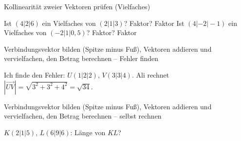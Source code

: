 \begin{aufgabe}{Kollinearität zweier Vektoren prüfen (Vielfaches)}
\begin{teile}
\teil Ist $(4 | 2 | 6)$ ein Vielfaches von $(2 | 1 | 3)$? Faktor? Faktor \leerfeld
\teil Ist $(4 | -2 | -1)$ ein Vielfaches von $(-2 | 1 | 0{,}5)$? Faktor? Faktor \leerfeld
\end{teile}
\end{aufgabe}

\begin{aufgabe}{Verbindungsvektor bilden (Spitze minus Fuß), Vektoren addieren und vervielfachen, den Betrag berechnen – Fehler finden}
\begin{teile}
\teil Ich finde den Fehler: $U(1 | 2 | 2)$, $V(3 | 3 | 4)$. Ali rechnet $|\overrightarrow{UV}| = \sqrt{3^2 + 3^2 + 4^2} = \sqrt{34}$.
\end{teile}
\end{aufgabe}

\begin{aufgabe}{Verbindungsvektor bilden (Spitze minus Fuß), Vektoren addieren und vervielfachen, den Betrag berechnen – selbst rechnen}
\begin{teile}
\teil $K(2 | 1 | 5)$, $L(6 | 9 | 6)$: Länge von $KL$? \leerfeld
\end{teile}
\end{aufgabe}

